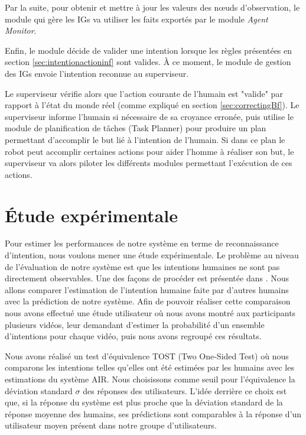\documentclass[a4paper,11pt,twoside]{StyleThese}
\begin{document}
Par la suite, pour obtenir et mettre à jour les valeurs des nœuds d'observation, le module qui gère les IGs va utiliser les faits exportés par le module \textit{Agent Monitor}.

Enfin, le module décide de valider une intention lorsque les règles présentées en section \ref{sec:intentionactioninf} sont valides. À ce moment, le module de gestion des IGs envoie l'intention reconnue au superviseur.

Le superviseur vérifie alors que l'action courante de l'humain est "valide" par rapport à l'état du monde réel (comme expliqué en section \ref{sec:correctingBf}).
Le superviseur informe l'humain si nécessaire de sa croyance erronée, puis utilise le module de planification de tâches (Task Planner) pour produire un plan permettant d'accomplir le but lié à l'intention de l'humain.
Si dans ce plan le robot peut accomplir certaines actions pour aider l'homme à réaliser son but, le superviseur va alors piloter les différents modules permettant l'exécution de ces actions.





\section{Étude expérimentale}
\label{sec:experimentsIntent}
Pour estimer les performances de notre système en terme de reconnaissance d'intention, nous voulons mener une étude expérimentale. Le problème au niveau de l'évaluation de notre système est que les intentions humaines ne sont pas directement observables. Une des façons de procéder est présentée dans \cite{baker2014modeling}. Nous allons comparer l'estimation de l'intention humaine faite par d'autres humains avec la prédiction de notre système. Afin de pouvoir réaliser cette comparaison nous avons effectué une étude utilisateur où nous avons montré aux participants plusieurs vidéos, leur demandant d'estimer la probabilité d'un ensemble d'intentions pour chaque vidéo, puis nous avons regroupé ces résultats.

Nous avons réalisé un test d'équivalence TOST (Two One-Sided Test) où nous comparons les intentions telles qu'elles ont été estimées par les humains avec les estimations du système AIR. Nous choisissons comme seuil pour l'équivalence la déviation standard $\sigma$ des réponses des utilisateurs. L'idée derrière ce choix est que, si la réponse du système est plus proche que la déviation standard de la réponse moyenne des humains, ses prédictions sont comparables à la réponse d'un utilisateur moyen présent dans notre groupe d'utilisateurs. 
\end{document}
